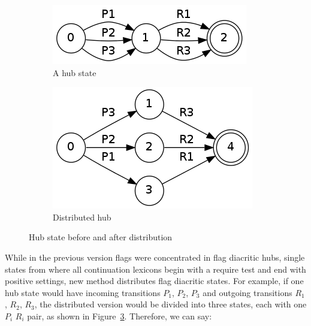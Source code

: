 \documentclass[11pt]{article}
\begin{document}
\begin{figure}
\centering
\begin{subfigure}[b]{0.4\textwidth}
        \includegraphics[width=\textwidth]{hub.png}
        \caption{A hub state}
        \label{fig:hub}
\end{subfigure}%
\quad %
\begin{subfigure}[b]{0.4\textwidth}
        \includegraphics[width=\textwidth]{distr.png}
        \caption{Distributed hub}
        \label{fig:distr}
\end{subfigure}
\caption{Hub state before and after distribution}
\label{fig:hub_distr}
\end{figure}


While in the previous version flags were concentrated in flag diacritic hubs, single states from where all continuation lexicons begin with a 
require test 
and end with positive settings, new method distributes flag diacritic states. For example, if one hub state would have incoming transitions 
$P_1$, $P_2$, $P_3$ and outgoing transitions $R_1$, $R_2$, $R_3$, the distributed version would be divided into three states, each with one 
$P_i$ $R_i$ pair, as shown in 
Figure~\ref{fig:hub_distr}. Therefore, we can say:
\end{document}
